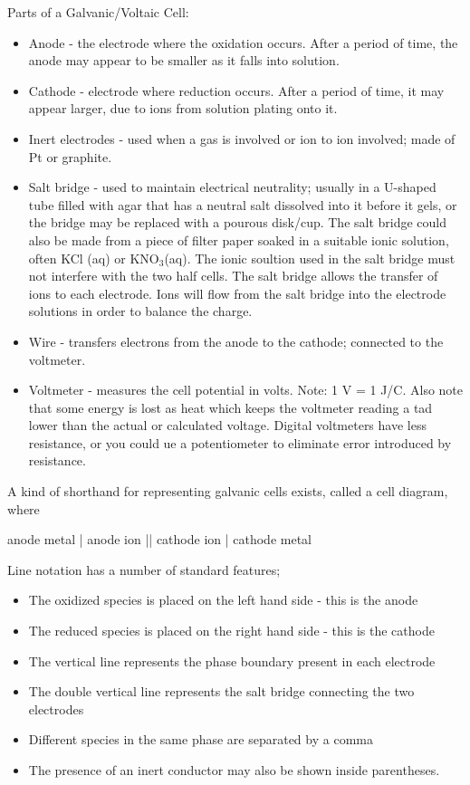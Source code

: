 \documentclass[../chem.tex]{subfiles}
\begin{document}
Parts of a Galvanic/Voltaic Cell:
\begin{itemize}
    \item Anode - the electrode where the oxidation occurs. After a period of time, the anode may appear to be smaller as it falls into solution.
    \item Cathode - electrode where reduction occurs. After a period of time, it may appear larger, due to ions from solution plating onto it.
    \item Inert electrodes - used when a gas is involved or ion to ion involved; made of Pt or graphite.
    \item Salt bridge - used to maintain electrical neutrality; usually in a U-shaped tube filled with agar that has a neutral salt dissolved into 
    it before it gels, or the bridge may be replaced with a pourous disk/cup. The salt bridge could also be made from a piece of filter paper soaked in a suitable ionic solution, often KCl (aq) or 
    KNO$_3$(aq). The ionic soultion used in the salt bridge must not interfere with the two half cells. The salt bridge allows the transfer of ions 
    to each electrode. Ions will flow from the salt bridge into the electrode solutions in order to balance the charge.
    \item Wire - transfers electrons from the anode to the cathode; connected to the voltmeter.
    \item Voltmeter - measures the cell potential in volts. Note: 1 V = 1 J/C. Also note that some energy is lost as heat which keeps the voltmeter 
    reading a tad lower than the actual or calculated voltage. Digital voltmeters have less resistance, or you could ue a potentiometer to eliminate error 
    introduced by resistance.
\end{itemize}

A kind of shorthand for representing galvanic cells exists, called a cell diagram, where 
\begin{center}
    anode metal | anode ion || cathode ion | cathode metal
\end{center}

Line notation has a number of standard features;
\begin{itemize}
    \item The oxidized species is placed on the left hand side - this is the anode 
    \item The reduced species is placed on the right hand side - this is the cathode 
    \item The vertical line represents the phase boundary present in each electrode
    \item The double vertical line represents the salt bridge connecting the two electrodes
    \item Different species in the same phase are separated by a comma 
    \item The presence of an inert conductor may also be shown inside parentheses.
\end{itemize}
\end{document}
